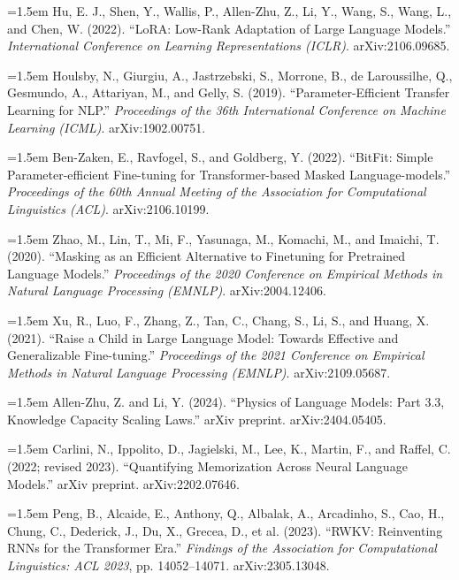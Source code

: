 \documentclass[11pt]{article}
\begin{document}
\par\hangindent=1.5em
Hu, E. J., Shen, Y., Wallis, P., Allen-Zhu, Z., Li, Y., Wang, S., Wang, L., and Chen, W. (2022). ``LoRA: Low-Rank Adaptation of Large Language Models.'' \textit{International Conference on Learning Representations (ICLR)}. arXiv:2106.09685.

\par\hangindent=1.5em
Houlsby, N., Giurgiu, A., Jastrzebski, S., Morrone, B., de Laroussilhe, Q., Gesmundo, A., Attariyan, M., and Gelly, S. (2019). ``Parameter-Efficient Transfer Learning for NLP.'' \textit{Proceedings of the 36th International Conference on Machine Learning (ICML)}. arXiv:1902.00751.

\par\hangindent=1.5em
Ben-Zaken, E., Ravfogel, S., and Goldberg, Y. (2022). ``BitFit: Simple Parameter-efficient Fine-tuning for Transformer-based Masked Language-models.'' \textit{Proceedings of the 60th Annual Meeting of the Association for Computational Linguistics (ACL)}. arXiv:2106.10199.

\par\hangindent=1.5em
Zhao, M., Lin, T., Mi, F., Yasunaga, M., Komachi, M., and Imaichi, T. (2020). ``Masking as an Efficient Alternative to Finetuning for Pretrained Language Models.'' \textit{Proceedings of the 2020 Conference on Empirical Methods in Natural Language Processing (EMNLP)}. arXiv:2004.12406.

\par\hangindent=1.5em
Xu, R., Luo, F., Zhang, Z., Tan, C., Chang, S., Li, S., and Huang, X. (2021). ``Raise a Child in Large Language Model: Towards Effective and Generalizable Fine-tuning.'' \textit{Proceedings of the 2021 Conference on Empirical Methods in Natural Language Processing (EMNLP)}. arXiv:2109.05687.

\par\hangindent=1.5em
Allen-Zhu, Z. and Li, Y. (2024). ``Physics of Language Models: Part 3.3, Knowledge Capacity Scaling Laws.'' arXiv preprint. arXiv:2404.05405.

\par\hangindent=1.5em
Carlini, N., Ippolito, D., Jagielski, M., Lee, K., Martin, F., and Raffel, C. (2022; revised 2023). ``Quantifying Memorization Across Neural Language Models.'' arXiv preprint. arXiv:2202.07646.

\par\hangindent=1.5em
Peng, B., Alcaide, E., Anthony, Q., Albalak, A., Arcadinho, S., Cao, H., Chung, C., Dederick, J., Du, X., Grecea, D., et al. (2023). ``RWKV: Reinventing RNNs for the Transformer Era.'' \textit{Findings of the Association for Computational Linguistics: ACL 2023}, pp. 14052--14071. arXiv:2305.13048.
\end{document}
